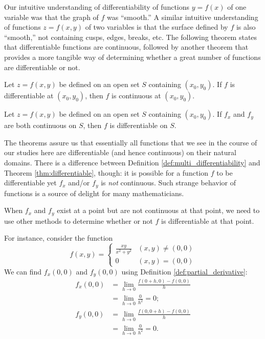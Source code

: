 Our intuitive understanding of differentiability of functions $y=f(x)$ of one variable was that the graph of $f$ was ``smooth.'' A similar intuitive understanding of functions $z=f(x,y)$ of two variables is that the surface defined by $f$ is also ``smooth,'' not containing cusps, edges, breaks,  etc. The following theorem states that differentiable functions are continuous, followed by another theorem that   provides a
more tangible way of determining whether a great number of functions are differentiable or not.

{Let $z=f(x,y)$ be defined on an open set $S$ containing $(x_0,y_0)$. 
If $f$ is differentiable at $(x_0,y_0)$, then $f$ is continuous at $(x_0,y_0)$.
}

{Let $z=f(x,y)$ be defined on an open set $S$ containing $(x_0,y_0)$. 
If $f_x$ and $f_y$ are both continuous on $S$, then $f$ is differentiable on $S$.
}

The theorems assure us that  essentially all functions that we see in the course of our studies here are differentiable (and hence continuous) on their natural domains. There is a difference between Definition \ref{def:multi_differentiability} and Theorem \ref{thm:differentiable}, though: it is possible for a function $f$ to be differentiable yet $f_x$ and/or $f_y$ is \textit{not} continuous. Such strange behavior of functions is a source of delight for many mathematicians.

When $f_x$ and $f_y$  exist at a point but are not continuous at that point, we need to use other methods to determine whether or not $f$ is differentiable at that point.

For instance, consider the function 
$$f(x,y) = \left\{\begin{array}{cl} \frac{xy}{x^2+y^2} & (x,y)\neq (0,0) \\
																0 & (x,y) = (0,0)\end{array}\right.$$
We can find $f_x(0,0)$ and $f_y(0,0)$ using Definition 	\ref{def:partial_derivative}:
\begin{align*}
f_x(0,0) &= \lim_{h\to 0} \frac{f(0+h,0) - f(0,0)}{h} \\
				&= \lim_{h\to 0} \frac{0}{h^2} = 0;\\
f_y(0,0) &= \lim_{h\to 0} \frac{f(0,0+h) - f(0,0)}{h} \\
				&= \lim_{h\to 0} \frac{0}{h^2} = 0.
\end{align*}

